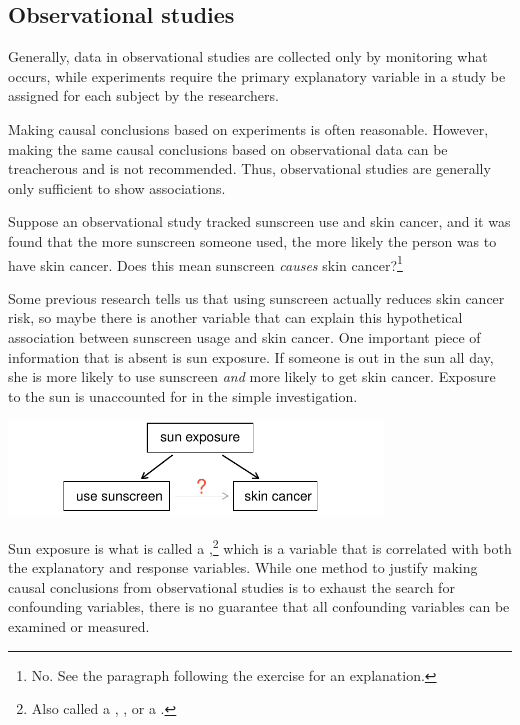 \subsection{Observational studies}

Generally, data in observational studies are collected only by monitoring what occurs, while experiments require the primary explanatory variable in a study be assigned for each subject by the researchers.

Making causal conclusions based on experiments is often reasonable. However, making the same causal conclusions based on observational data can be treacherous and is not recommended. Thus, observational studies are generally only sufficient to show associations.

\begin{exercise} \label{sunscreenLurkingExample}
Suppose an observational study tracked sunscreen use and skin cancer, and it was found that the more sunscreen someone used, the more likely the person was to have skin cancer. Does this mean sunscreen \emph{causes} skin cancer?\footnote{No. See the paragraph following the exercise for an explanation.}
\end{exercise}

Some previous research tells us that using sunscreen actually reduces skin cancer risk, so maybe there is another variable that can explain this hypothetical association between sunscreen usage and skin cancer. One important piece of information that is absent is sun exposure. If someone is out in the sun all day, she is more likely to use sunscreen \emph{and} more likely to get skin cancer. Exposure to the sun is unaccounted for in the simple investigation.
\begin{center}
\includegraphics[height=1.0in]{ch_intro_to_data/figures/variables/sunCausesCancer}
\end{center}

Sun exposure is what is called a ,\footnote{Also called a , , or a .} which is a variable that is correlated with both the explanatory and response variables. While one method to justify making causal conclusions from observational studies is to exhaust the search for confounding variables, there is no guarantee that all confounding variables can be examined or measured.

